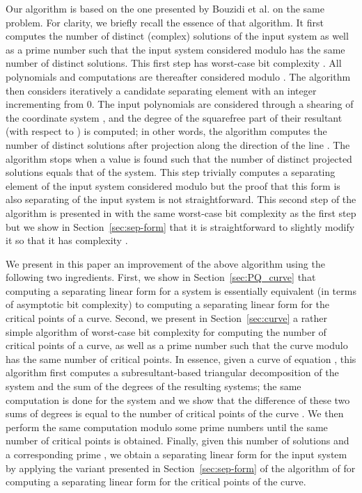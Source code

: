 \documentclass{sig-alternate}
\newcommand{\blue}[1]{\color{blue}#1\color{black}\xspace}
\renewcommand{\blue}[1]{#1\xspace}
\begin{document}
Our algorithm is based on the one presented by Bouzidi et
al.  \blue{\cite{bouzidiJSC2014a}} on the same problem. For clarity, we briefly
recall the essence of that algorithm. It  first computes the number of distinct (complex) solutions of the input system  as well as a
prime number  such that the input system considered modulo  has the same number of
distinct solutions. This first step has worst-case bit complexity . 
All polynomials and computations are thereafter considered modulo
. The algorithm then considers iteratively
a candidate separating element  with an integer   incrementing  from 0. 
The input polynomials are considered through a  \blue{shearing} of
the coordinate system , and the degree of the squarefree
part of their resultant (with respect to ) is computed; 
in other words, the algorithm computes the number of
distinct solutions after  projection along the direction of the line . The algorithm stops
when a value  is found such that the number of distinct projected solutions equals that of the
system. This step trivially computes a separating element  of the input system considered modulo
 but the proof that this form is also separating of the  input system is not straightforward. 
This second step of the algorithm is presented in \blue{\cite{bouzidiJSC2014a}} with the same 
worst-case bit complexity as the first step  but we show \blue{in Section~\ref{sec:sep-form}} that it is straightforward to slightly  modify it so
that it has complexity \blue{.}

We present in this paper an improvement of the above algorithm using the following two
ingredients. First, we
show \blue{in Section~\ref{sec:PQ_curve}}  that computing a separating linear form for a system  is essentially equivalent (in terms of
asymptotic bit complexity) to computing a separating linear form for the critical points of a curve.
Second, 
we present \blue{in Section~\ref{sec:curve}}  a rather simple algorithm of worst-case bit complexity  for computing the number of critical points of a
curve, as well as a prime number  such that the curve modulo  has the same number of
 critical points. In essence, given a curve of equation , this algorithm first computes a subresultant-based
triangular decomposition \cite{VegKah:curve2d:96} of the
system  and the sum of the degrees of the resulting systems; the same
computation is done for the system  and we show that the
difference of these two sums of degrees is equal to the number of critical points of the 
curve . We then perform the same computation modulo some prime numbers  until the same
number of critical points is obtained. Finally, given this number of solutions and a
corresponding prime , we obtain a separating linear form for the input system by  applying  the
\blue{variant presented in Section~\ref{sec:sep-form} of the} algorithm of 
\blue{\cite{bouzidiJSC2014a}} for computing a separating linear form for the critical points of the
curve.
\end{document}
